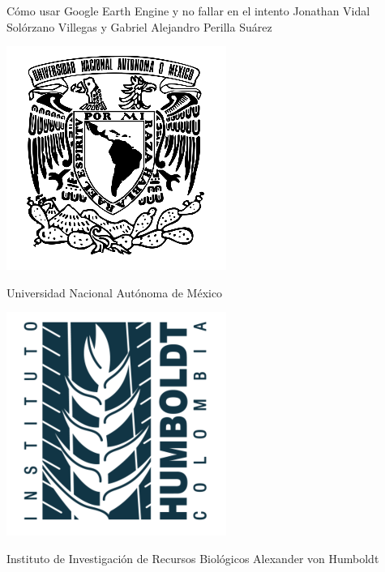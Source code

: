 \vspace*{\fill}
\begin{center}
\LARGE{Cómo usar Google Earth Engine y no fallar en el intento}
\linebreak
\linebreak
\large{Jonathan Vidal Solórzano Villegas y Gabriel Alejandro Perilla Suárez}
\end{center}
\vspace{15mm}
\setlength{\columnsep}{40pt}
\begin{multicols}{2}
    \begin{Figure}
    \centering
    \includegraphics[width=0.7\linewidth]{Img/unam}
    \end{Figure}
    \centering Universidad Nacional Autónoma de México
    \begin{Figure}
    \centering
    \includegraphics[width=0.7\linewidth]{Img/humb}
    \end{Figure}
    \centering Instituto de Investigación de Recursos Biológicos Alexander von Humboldt 
\end{multicols}
\vspace*{\fill}

